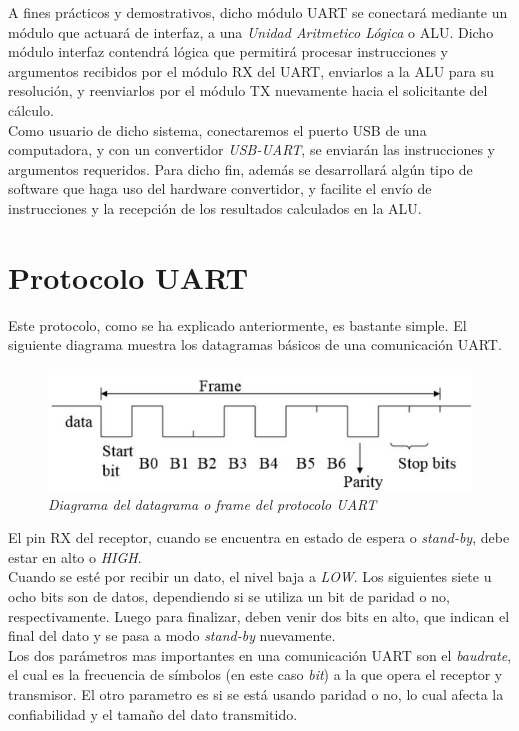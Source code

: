 \documentclass{article}
\begin{document}
\indent A fines prácticos y demostrativos, dicho módulo UART se conectará mediante un
módulo que actuará de interfaz, a una \textit{Unidad Aritmetico Lógica} o ALU.
Dicho módulo interfaz contendrá lógica que permitirá procesar instrucciones y argumentos recibidos
por el módulo RX del UART, enviarlos a la ALU para su resolución, y reenviarlos por el módulo TX
nuevamente hacia el solicitante del cálculo. \\
\indent Como usuario de dicho sistema, conectaremos el puerto USB de una computadora, y con un convertidor
\textit{USB-UART}, se enviarán las instrucciones y argumentos requeridos. Para dicho fin, además se
desarrollará algún tipo de software que haga uso del hardware convertidor, y facilite el envío de instrucciones
y la recepción de los resultados calculados en la ALU.\\

\newpage
\section{Protocolo UART}
\indent Este protocolo, como se ha explicado anteriormente, es bastante simple. El siguiente diagrama muestra los
datagramas básicos de una comunicación UART.

\begin{figure}[H]
    \includegraphics[scale=0.5]{protocol}
    \caption{\textit{Diagrama del datagrama o frame del protocolo UART}}
\end{figure}

\indent El pin RX del receptor, cuando se encuentra en estado de espera o \textit{stand-by}, debe estar en alto o \textit{HIGH}. \\
Cuando se esté por recibir un dato, el nivel baja a \textit{LOW}. Los siguientes siete u ocho bits son de datos, dependiendo si
se utiliza un bit de paridad o no, respectivamente. Luego para finalizar, deben venir dos bits en alto, que indican el final del dato
y se pasa a modo \textit{stand-by} nuevamente. \\
\indent Los dos parámetros mas importantes en una comunicación UART son el \textit{baudrate}, el cual es la frecuencia de símbolos (en este caso \textit{bit}) a la que opera el receptor y transmisor. El otro parametro es si se está usando paridad o no, lo cual afecta la confiabilidad y el tamaño del dato transmitido.
\end{document}
